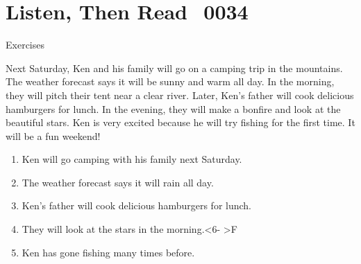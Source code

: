\documentclass[aspectratio=169,xcolor={dvipsnames,table}]{beamer}
\newcommand{\myaudio}[1]{\href{#1}{\faVolumeUp}}
\begin{document}
\section{Listen, Then Read\,\,\,\,\,{\tiny 0034}\,{\scriptsize \myaudio{./audio/012_will_reading.mp3}}}
\begin{frame}[plain,t]{Exercises}
    \begin{tcolorbox}[colframe=ForestGreen,
      colback=NavyBlue!10!white,
      colbacktitle=NavyBlue!40!white,
      coltitle=black, %
    before upper={\setlength{\parindent}{1.25em}},
     title={Next Weekend's Camping Trip\hfill{\tiny 0047}\quad{\scriptsize
  \myaudio{./audio/012_will_reading.mp3}}}
    ]
    Next Saturday, Ken and his family will go on a camping trip in the
  mountains.
    The weather forecast says it will be sunny and warm all day.
    In the morning, they will pitch their tent near a clear river.
    Later, Ken's father will cook delicious hamburgers for lunch.
    In the evening, they will make a bonfire and look at the beautiful stars.
    Ken is very excited because he will try fishing for the first time.
    It will be a fun weekend!
    \end{tcolorbox}

    \vspace{-4pt}
    \vspace{-11pt}
    \begin{enumerate}\setlength{\itemsep}{-3.2pt}
    \item<2-> Ken will go camping with his family next Saturday.
  \hfill{}
    \item<2-> The weather forecast says it will rain all day.
  \hfill{}
    \item<2-> Ken's father will cook delicious hamburgers for lunch.
  \hfill{}
    \item<2-> They will look at the stars in the morning.\hfill\visible<6-
  >{F}
    \item<2-> Ken has gone fishing many times before.\hfill{}
    \end{enumerate}
    \end{frame}
\end{document}
